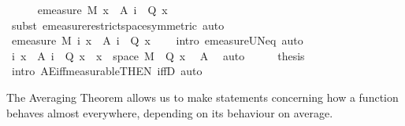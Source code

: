 \begin{isabellebody}
\ \ \ \ \isamarkupfalse%
\ {\isachardoublequoteopen}emeasure\ M\ {\isacharbraceleft}{\kern0pt}x\ {\isasymin}\ A\ i{\isachardot}{\kern0pt}\ {\isasymnot}\ Q\ x{\isacharbraceright}{\kern0pt}\ {\isacharequal}{\kern0pt}\ {}{\isachardoublequoteclose}\ \isamarkupfalse%
\ {\isacharparenleft}{\kern0pt}subst\ emeasure{\isacharunderscore}{\kern0pt}restrict{\isacharunderscore}{\kern0pt}space{\isacharbrackleft}{\kern0pt}symmetric{\isacharbrackright}{\kern0pt}{\isacharcomma}{\kern0pt}\ auto{\isacharparenright}{\kern0pt}\isanewline
\ \ \isacommand{{\isacharbraceright}{\kern0pt}}\isamarkupfalse%
\isanewline
\ \ \isamarkupfalse%
\ {\isachardoublequoteopen}emeasure\ M\ {\isacharparenleft}{\kern0pt}{\isasymUnion}i{\isachardot}{\kern0pt}\ {\isacharbraceleft}{\kern0pt}x\ {\isasymin}\ A\ i{\isachardot}{\kern0pt}\ {\isasymnot}\ Q\ x{\isacharbraceright}{\kern0pt}{\isacharparenright}{\kern0pt}\ {\isacharequal}{\kern0pt}\ {}{\isachardoublequoteclose}\ \isamarkupfalse%
\ {\isacharparenleft}{\kern0pt}intro\ emeasure{\isacharunderscore}{\kern0pt}UN{\isacharunderscore}{\kern0pt}eq{\isacharunderscore}{\kern0pt}{}{\isacharcomma}{\kern0pt}\ auto{\isacharparenright}{\kern0pt}\isanewline
\ \ \isamarkupfalse%
\ \isamarkupfalse%
\ {\isachardoublequoteopen}{\isacharparenleft}{\kern0pt}{\isasymUnion}i{\isachardot}{\kern0pt}\ {\isacharbraceleft}{\kern0pt}x\ {\isasymin}\ A\ i{\isachardot}{\kern0pt}\ {\isasymnot}\ Q\ x{\isacharbraceright}{\kern0pt}{\isacharparenright}{\kern0pt}\ {\isacharequal}{\kern0pt}\ {\isacharbraceleft}{\kern0pt}x\ {\isasymin}\ space\ M{\isachardot}{\kern0pt}\ {\isasymnot}\ Q\ x{\isacharbraceright}{\kern0pt}{\isachardoublequoteclose}\ \isamarkupfalse%
\ A\ \isamarkupfalse%
\ auto\isanewline
\ \ \isamarkupfalse%
\ \isamarkupfalse%
\ {\isacharquery}{\kern0pt}thesis\ \isamarkupfalse%
\ {\isacharparenleft}{\kern0pt}intro\ AE{\isacharunderscore}{\kern0pt}iff{\isacharunderscore}{\kern0pt}measurable{\isacharbrackleft}{\kern0pt}THEN\ iffD{}{\isacharbrackright}{\kern0pt}{\isacharcomma}{\kern0pt}\ auto{\isacharparenright}{\kern0pt}\isanewline
{}\isamarkupfalse%
%
\endisatagproof
{\isafoldproof}%
%
\isadelimproof
%
\endisadelimproof
%
\begin{isamarkuptext}%
The Averaging Theorem allows us to make statements concerning how a function behaves almost everywhere, depending on its behaviour on average.%

\end{isamarkuptext}
\end{isabellebody}
